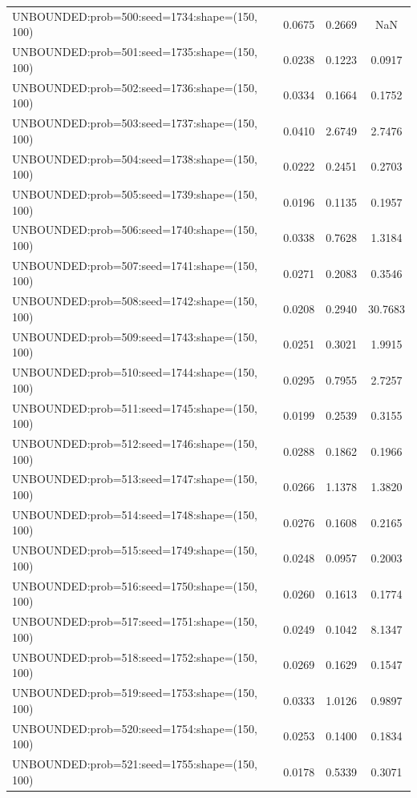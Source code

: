 \begin{longtable}{lccc}
UNBOUNDED:prob=500:seed=1734:shape=(150, 100) &   0.0675 &  0.2669 &     NaN \\
UNBOUNDED:prob=501:seed=1735:shape=(150, 100) &   0.0238 &  0.1223 &  0.0917 \\
UNBOUNDED:prob=502:seed=1736:shape=(150, 100) &   0.0334 &  0.1664 &  0.1752 \\
UNBOUNDED:prob=503:seed=1737:shape=(150, 100) &   0.0410 &  2.6749 &  2.7476 \\
UNBOUNDED:prob=504:seed=1738:shape=(150, 100) &   0.0222 &  0.2451 &  0.2703 \\
UNBOUNDED:prob=505:seed=1739:shape=(150, 100) &   0.0196 &  0.1135 &  0.1957 \\
UNBOUNDED:prob=506:seed=1740:shape=(150, 100) &   0.0338 &  0.7628 &  1.3184 \\
UNBOUNDED:prob=507:seed=1741:shape=(150, 100) &   0.0271 &  0.2083 &  0.3546 \\
UNBOUNDED:prob=508:seed=1742:shape=(150, 100) &   0.0208 &  0.2940 & 30.7683 \\
UNBOUNDED:prob=509:seed=1743:shape=(150, 100) &   0.0251 &  0.3021 &  1.9915 \\
UNBOUNDED:prob=510:seed=1744:shape=(150, 100) &   0.0295 &  0.7955 &  2.7257 \\
UNBOUNDED:prob=511:seed=1745:shape=(150, 100) &   0.0199 &  0.2539 &  0.3155 \\
UNBOUNDED:prob=512:seed=1746:shape=(150, 100) &   0.0288 &  0.1862 &  0.1966 \\
UNBOUNDED:prob=513:seed=1747:shape=(150, 100) &   0.0266 &  1.1378 &  1.3820 \\
UNBOUNDED:prob=514:seed=1748:shape=(150, 100) &   0.0276 &  0.1608 &  0.2165 \\
UNBOUNDED:prob=515:seed=1749:shape=(150, 100) &   0.0248 &  0.0957 &  0.2003 \\
UNBOUNDED:prob=516:seed=1750:shape=(150, 100) &   0.0260 &  0.1613 &  0.1774 \\
UNBOUNDED:prob=517:seed=1751:shape=(150, 100) &   0.0249 &  0.1042 &  8.1347 \\
UNBOUNDED:prob=518:seed=1752:shape=(150, 100) &   0.0269 &  0.1629 &  0.1547 \\
UNBOUNDED:prob=519:seed=1753:shape=(150, 100) &   0.0333 &  1.0126 &  0.9897 \\
UNBOUNDED:prob=520:seed=1754:shape=(150, 100) &   0.0253 &  0.1400 &  0.1834 \\
UNBOUNDED:prob=521:seed=1755:shape=(150, 100) &   0.0178 &  0.5339 &  0.3071 \\

\end{longtable}
